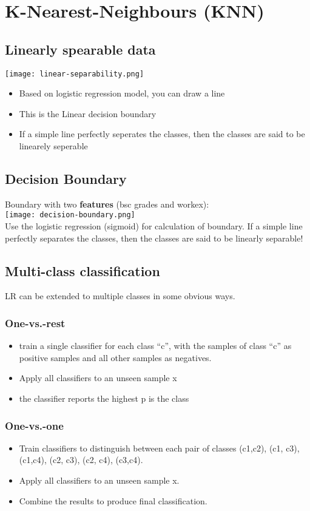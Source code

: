 \section{K-Nearest-Neighbours (KNN)}
\subsection{Linearly spearable data}
\texttt{[image: linear-separability.png]}
\begin{itemize}
  \item Based on logistic regression model, you can draw a line
  \item This is the Linear decision boundary
  \item If a simple line perfectly seperates the classes, then the classes are said to be linearely seperable
\end{itemize}
\subsection{Decision Boundary}
Boundary with two \textbf{features} (bsc grades and workex):\\
\texttt{[image: decision-boundary.png]}\\
Use the logistic regression (sigmoid) for calculation of boundary.
If a simple line perfectly separates the classes, then the classes are said to be linearly separable!

\subsection{Multi-class classification}
LR can be extended to multiple classes in some obvious ways.

\subsubsection{One-vs.-rest}
\begin{itemize}
  \item train a single classifier for each class ``c'', with the samples of class ``c'' as positive samples and all other samples as negatives.
  \item Apply all classifiers to an unseen sample x
  \item the classifier reports the highest p is the class
\end{itemize}

\subsubsection{One-vs.-one}
\begin{itemize}
  \item Train classifiers to distinguish between each pair of classes (c1,c2), (c1, c3), (c1,c4), (c2, c3), (c2, c4), (c3,c4).
  \item Apply all classifiers to an unseen sample x.
  \item Combine the results to produce final classification.
\end{itemize}


